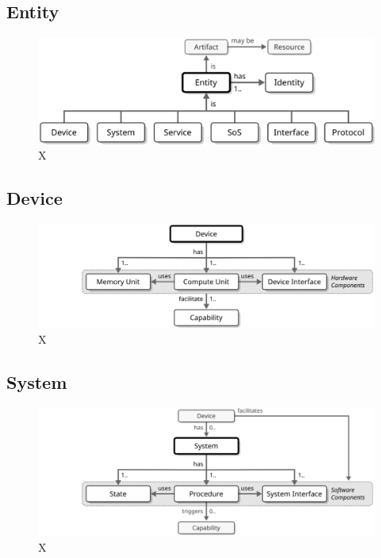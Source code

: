 \subsection{Entity}
\label{sec:reference-model:entity}

\begin{figure}[ht!]
  \centering
  \includegraphics{figures/entity}
  \caption{
    X
  }
  \label{fig:entity}
\end{figure}

\subsection{Device}
\label{sec:reference-model:device}

\begin{figure}[ht!]
  \centering
  \includegraphics{figures/device}
  \caption{
    X
  }
  \label{fig:device}
\end{figure}

\subsection{System}
\label{sec:reference-model:system}

\begin{figure}[ht!]
  \centering
  \includegraphics{figures/system}
  \caption{
    X
  }
  \label{fig:system}
\end{figure}

